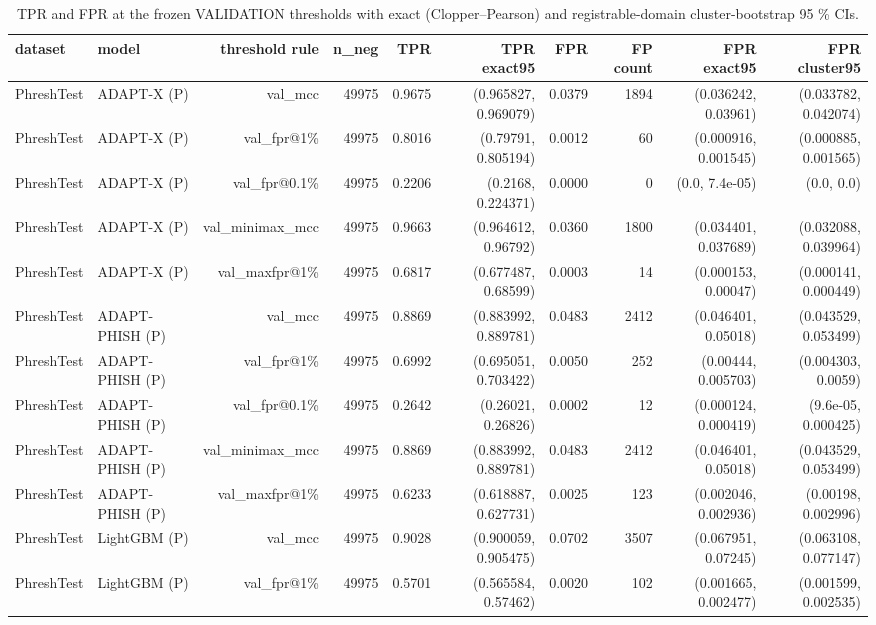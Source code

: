 \begin{table}[t]
\centering
\scriptsize
\caption{TPR and FPR at the frozen VALIDATION thresholds with exact (Clopper–Pearson) and registrable-domain cluster-bootstrap 95 \% CIs.}
\label{tab:rev_R4_operating_points_with_CIs}
\begin{tabular}{llrrrrrrrr}
\toprule
dataset & model & threshold rule & n\_neg & TPR & TPR exact95 & FPR & FP count & FPR exact95 & FPR cluster95 \\
\midrule
PhreshTest & ADAPT-X (P) & val\_mcc & 49975 & 0.9675 & (0.965827, 0.969079) & 0.0379 & 1894 & (0.036242, 0.03961) & (0.033782, 0.042074) \\
PhreshTest & ADAPT-X (P) & val\_fpr@1\% & 49975 & 0.8016 & (0.79791, 0.805194) & 0.0012 & 60 & (0.000916, 0.001545) & (0.000885, 0.001565) \\
PhreshTest & ADAPT-X (P) & val\_fpr@0.1\% & 49975 & 0.2206 & (0.2168, 0.224371) & 0.0000 & 0 & (0.0, 7.4e-05) & (0.0, 0.0) \\
PhreshTest & ADAPT-X (P) & val\_minimax\_mcc & 49975 & 0.9663 & (0.964612, 0.96792) & 0.0360 & 1800 & (0.034401, 0.037689) & (0.032088, 0.039964) \\
PhreshTest & ADAPT-X (P) & val\_maxfpr@1\% & 49975 & 0.6817 & (0.677487, 0.68599) & 0.0003 & 14 & (0.000153, 0.00047) & (0.000141, 0.000449) \\
PhreshTest & ADAPT-PHISH (P) & val\_mcc & 49975 & 0.8869 & (0.883992, 0.889781) & 0.0483 & 2412 & (0.046401, 0.05018) & (0.043529, 0.053499) \\
PhreshTest & ADAPT-PHISH (P) & val\_fpr@1\% & 49975 & 0.6992 & (0.695051, 0.703422) & 0.0050 & 252 & (0.00444, 0.005703) & (0.004303, 0.0059) \\
PhreshTest & ADAPT-PHISH (P) & val\_fpr@0.1\% & 49975 & 0.2642 & (0.26021, 0.26826) & 0.0002 & 12 & (0.000124, 0.000419) & (9.6e-05, 0.000425) \\
PhreshTest & ADAPT-PHISH (P) & val\_minimax\_mcc & 49975 & 0.8869 & (0.883992, 0.889781) & 0.0483 & 2412 & (0.046401, 0.05018) & (0.043529, 0.053499) \\
PhreshTest & ADAPT-PHISH (P) & val\_maxfpr@1\% & 49975 & 0.6233 & (0.618887, 0.627731) & 0.0025 & 123 & (0.002046, 0.002936) & (0.00198, 0.002996) \\
PhreshTest & LightGBM (P) & val\_mcc & 49975 & 0.9028 & (0.900059, 0.905475) & 0.0702 & 3507 & (0.067951, 0.07245) & (0.063108, 0.077147) \\
PhreshTest & LightGBM (P) & val\_fpr@1\% & 49975 & 0.5701 & (0.565584, 0.57462) & 0.0020 & 102 & (0.001665, 0.002477) & (0.001599, 0.002535) \\

\end{tabular}
\end{table}
